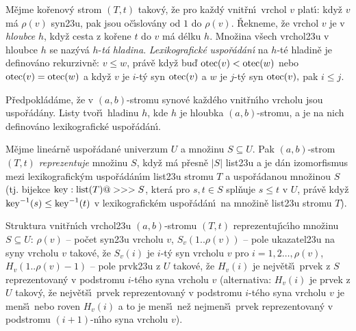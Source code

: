 \flushpar M\v ejme ko\v renov\'y strom $(T,t)$ takov\'y, \v ze pro ka\v zd\'y 
vnit\v rn\'\i\ vrchol $v$ plat\'\i :\newline 
kdy\v z $v$ m\'a $\rho (v)$ syn\accent23u, pak jsou o\v c\'\i slov\'any od $
1$ do 
$\rho (v)$. \v Rekne\-me, \v ze vrchol $v$ je v \emph{hloubce} $h$, kdy\v z 
cesta z ko\v rene $t$ do $v$ m\'a d\'elku $h$. Mno\v zina v\v sech 
vrchol\accent23u v hloubce $h$ se naz\'yv\'a $h$-\emph{t\'a} 
\emph{hladina}. \emph{Lexikografick\'e} \emph{uspo\v r\'ad\'an\'\i} 
na $h$-t\'e hladin\v e je definov\'ano rekurzivn\v e:\newline 
\newline 
$v\le w$, pr\'av\v e kdy\v z bu\v d $\operatorname{otec}(v)<\operatorname{otec}(w)$ nebo 
$\operatorname{otec}(v)=\operatorname{otec}(w)$ a kdy\v z $v$ je $i$-t\'y syn $\operatorname{otec}(v)$ a $w$ je 
$j$-t\'y syn $\operatorname{otec}(v),$ pak $i\le j$.  
\medskip

\flushpar P\v redpokl\'ad\'ame, \v ze v $(a,b)$-stromu  
synov\'e ka\v zd\'eho vnit\v rn\'\i ho vrcholu jsou uspo\v r\'ad\'any. Listy 
tvo\v r\'\i\ hladinu $h$, kde $h$ je hloub\-ka $(a,b)$-stromu, a je na nich 
definov\'ano lexikografick\'e uspo\v r\'a\-d\'a\-n\'\i .
\medskip

\flushpar M\v ejme line\'arn\v e uspo\v r\'adan\'e univerzum $U$ a 
mno\v zinu $S\subseteq U$.  Pak $(a,b)$-strom $(T,t)$ 
\emph{reprezentuje} mno\v zinu $S$, kdy\v z m\'a p\v resn\v e $|S
|$ 
list\accent23u a je d\'an izomorfismus mezi lexikografick\'ym uspo\v r\'a\-d\'a\-n\'\i m 
list\accent23u stromu $T$ a uspo\v r\'adanou mno\v zinou $S$ 
(tj.  bijekce $\operatorname{key}:\operatorname{list}(T)@>>>S$, kter\'a pro $s,t\in S$ 
spl\v nuje $s\le t$ v $U$, pr\'av\v e kdy\v z $\operatorname{key}^{-1}(s)\le\operatorname{key}^{
-1}(t)$ v 
lexikografick\'em uspo\v r\'ad\'an\'\i\ na mno\v zin\v e list\accent23u 
stromu $T$).  
\medskip

\flushpar Struktura vnit\v rn\'\i ch vrchol\accent23u 
$(a,b)$-stromu $(T,t)$ reprezentuj\'\i c\'\i\-ho mno\v zinu 
$S\subseteq U$:\newline 
$\rho (v)$ -- po\v cet syn\accent23u vrcholu $v$,\newline 
$S_v(1..\rho (v))$ -- pole ukazatel\accent23u na syny vrcholu $v$ takov\'e, 
\v ze $S_v(i)$ je $i$-t\'y syn vrcholu $v$ pro 
$i=1,2\dots,\rho (v)$,\newline 
$H_v(1..\rho (v)-1)$ -- pole prvk\accent23u z $U$ takov\'e, \v ze $
H_v(i)$ 
je nejv\v et\v s\'\i\ prvek z $S$ reprezentovan\'y v podstromu 
$i$-t\'eho syna vrcholu $v$ (alternativa: $H_v(i)$ je prvek z $U$ 
takov\'y, \v ze nejv\v et\v s\'\i\ prvek reprezentovan\'y v podstromu $
i$-t\'eho 
syna vrcholu $v$ je men\v s\'\i\ nebo roven $H_v(i)$ a to je men\v s\'\i\  
ne\v z nejmen\v s\'\i\ prvek reprezentovan\'y v podstromu $(i+1)$-n\'\i ho 
syna vrcholu $v$).
\medskip

